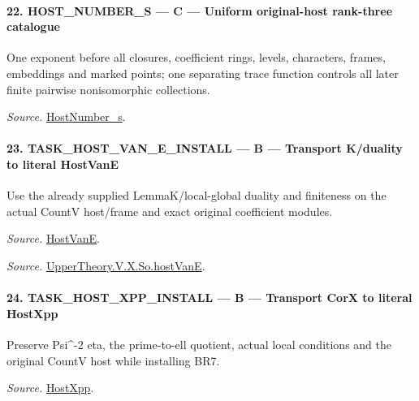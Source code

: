 \documentclass[11pt,a4paper]{article}
\numberwithin{equation}{section}
\theoremstyle{remark}\newtheorem{remark}[theorem]{Remark}
\begin{document}
\paragraph{22. HOST\_\allowbreak NUMBER\_\allowbreak S — C — Uniform original-host rank-three catalogue}

One exponent before all closures, coefficient rings, levels, characters, frames, embeddings and marked points; one separating trace function controls all later finite pairwise nonisomorphic collections.

\emph{Source.} \href{https://github.com/CocoSgt/riemann-hypothesis-lean/blob/7cbf7a0c32fca1badf05931879a37c3f8a2b03b4/src/Development/AutomorphicArithmetic/AutomorphicVarieties/ModularityArgument/ThresholdArguments/DenseThresholdCases/HostNumberS.lean#L18-L28}{HostNumber\_\allowbreak s}.



\paragraph{23. TASK\_\allowbreak HOST\_\allowbreak VAN\_\allowbreak E\_\allowbreak INSTALL — B — Transport K/duality to literal HostVanE}

Use the already supplied LemmaK/local-global duality and finiteness on the actual CountV host/frame and exact original coefficient modules.

\emph{Source.} \href{https://github.com/CocoSgt/riemann-hypothesis-lean/blob/7cbf7a0c32fca1badf05931879a37c3f8a2b03b4/src/Development/AutomorphicArithmetic/AutomorphicVarieties/UnitaryThreeDeformations/HostNumber.lean#L9-L12}{HostVanE}.

\emph{Source.} \href{https://github.com/CocoSgt/riemann-hypothesis-lean/blob/7cbf7a0c32fca1badf05931879a37c3f8a2b03b4/src/Development/AutomorphicArithmetic/AutomorphicVarieties/LevelCohomology/SoHostVanE.lean#L11-L18}{UpperTheory.V.X.So.hostVanE}.



\paragraph{24. TASK\_\allowbreak HOST\_\allowbreak XPP\_\allowbreak INSTALL — B — Transport CorX to literal HostXpp}

Preserve Psi\textasciicircum{}-2 eta, the prime-to-ell quotient, actual local conditions and the original CountV host while installing BR7.

\emph{Source.} \href{https://github.com/CocoSgt/riemann-hypothesis-lean/blob/7cbf7a0c32fca1badf05931879a37c3f8a2b03b4/src/Development/AutomorphicArithmetic/AutomorphicVarieties/UnitaryThreeDeformations/HostNumber.lean#L14-L17}{HostXpp}.
\end{document}

